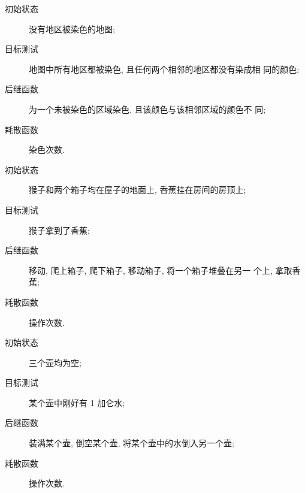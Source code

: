 \documentclass{homework}
\begin{document}
\maketitle
{}
\question{}
\begin{alphaparts}
    \questionpart{}
    \begin{description}
        \item[初始状态] 没有地区被染色的地图;
        \item[目标测试] 地图中所有地区都被染色, 且任何两个相邻的地区都没有染成相
            同的颜色;
        \item[后继函数] 为一个未被染色的区域染色, 且该颜色与该相邻区域的颜色不
            同;
        \item[耗散函数] 染色次数.
    \end{description}
    \questionpart{}
    \begin{description}
        \item[初始状态] 猴子和两个箱子均在屋子的地面上, 香蕉挂在房间的房顶上;
        \item[目标测试] 猴子拿到了香蕉;
        \item[后继函数] 移动, 爬上箱子, 爬下箱子, 移动箱子, 将一个箱子堆叠在另一
            个上, 拿取香蕉;
        \item[耗散函数] 操作次数.
    \end{description}
    \addtocounter{partCounter}{1}
    \questionpart{}
    \begin{description}
        \item[初始状态] 三个壶均为空;
        \item[目标测试] 某个壶中刚好有 1 加仑水;
        \item[后继函数] 装满某个壶, 倒空某个壶, 将某个壶中的水倒入另一个壶;
        \item[耗散函数] 操作次数.
    \end{description}
\end{alphaparts}
\end{document}
